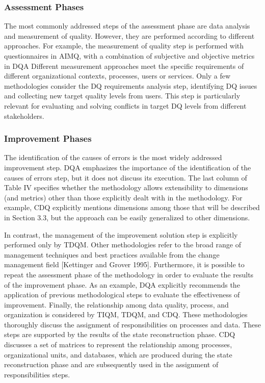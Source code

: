 \documentclass[pdftex,english,oribibl]{llncs}
\begin{document}
    \subsubsection{Assessment Phases}
    The most commonly addressed steps of the assessment phase are data analysis and measurement of quality. However, they are performed according to different approaches.
    For example, the measurement of quality step is performed with questionnaires in AIMQ, with a combination of subjective and objective metrics in DQA
    Different measurement approaches meet the specific requirements of different organizational contexts, processes, users or services. Only a few methodologies consider the DQ requirements analysis step, identifying DQ issues and collecting new target quality levels from users. This step is particularly relevant for evaluating and solving conflicts in target DQ levels from different stakeholders.


    \subsubsection{Improvement Phases}
    The identification of the causes of errors is the most widely addressed improvement step.
    DQA emphasizes the importance of the identification of the causes of errors step, but it does not discuss its execution.
    The last column of Table IV specifies whether the methodology allows extensibility to dimensions (and metrics) other than those explicitly dealt with in the methodology.
    For example, CDQ explicitly mentions dimensions among those that will be described in Section 3.3, but the approach can be easily generalized to other dimensions.

    In contrast, the management of the improvement solution step is explicitly performed only by TDQM.
    Other methodologies refer to the broad range of management techniques and best practices available from the change management field [Kettinger and Grover 1995].
    Furthermore, it is possible to repeat the assessment phase of the methodology in order to evaluate the results of the improvement phase.
    As an example, DQA explicitly recommends the application of previous methodological steps to evaluate the effectiveness of improvement.
    Finally, the relationship among data quality, process, and organization is considered by TIQM, TDQM, and CDQ.
    These methodologies thoroughly discuss the assignment of responsibilities on processes and data.
    These steps are supported by the results of the state reconstruction phase.
    CDQ discusses a set of matrices to represent the relationship among processes, organizational units, and databases, which are produced during the state reconstruction phase and are subsequently used in the assignment of responsibilities steps.
\end{document}
